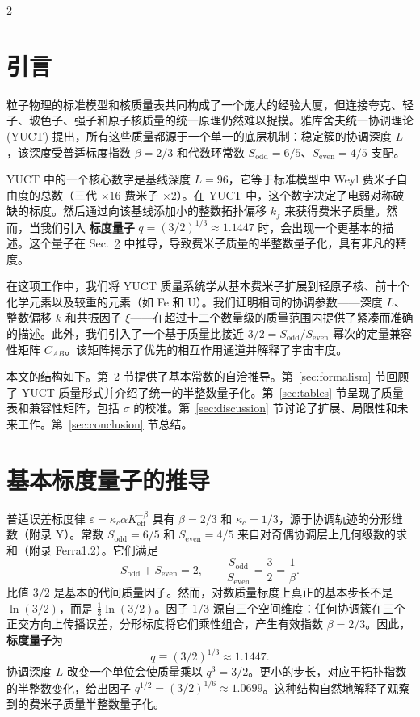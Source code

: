 \documentclass[11pt,a4paper]{article}
\newcommand{\Sodd}{S_{\mathrm{odd}}}
\newcommand{\Seven}{S_{\mathrm{even}}}
\begin{document}
	\begin{multicols}{2}
		
		\section{引言}
		
		粒子物理的标准模型和核质量表共同构成了一个庞大的经验大厦，但连接夸克、轻子、玻色子、强子和原子核质量的统一原理仍然难以捉摸。雅库舍夫统一协调理论 (YUCT) 提出，所有这些质量都源于一个单一的底层机制：稳定簇的协调深度 \(L\)，该深度受普适标度指数 \(\beta = 2/3\) 和代数环常数 \(S_{\mathrm{odd}}=6/5\)、\(S_{\mathrm{even}}=4/5\) 支配。
		
		YUCT 中的一个核心数字是基线深度 \(L = 96\)，它等于标准模型中 Weyl 费米子自由度的总数（三代 $\times 16$ 费米子 $\times 2$）。在 YUCT 中，这个数字决定了电弱对称破缺的标度。然后通过向该基线添加小的整数拓扑偏移 \(k_f\) 来获得费米子质量。然而，当我们引入 \textbf{标度量子} \(q = (3/2)^{1/3} \approx 1.1447\) 时，会出现一个更基本的描述。这个量子在 Sec.~\ref{sec:derivation} 中推导，导致费米子质量的半整数量子化，具有非凡的精度。
		
		在这项工作中，我们将 YUCT 质量系统学从基本费米子扩展到轻原子核、前十个化学元素以及较重的元素（如 Fe 和 U）。我们证明相同的协调参数——深度 \(L\)、整数偏移 \(k\) 和共振因子 \(\xi\)——在超过十二个数量级的质量范围内提供了紧凑而准确的描述。此外，我们引入了一个基于质量比接近 \(3/2 = S_{\mathrm{odd}}/S_{\mathrm{even}}\) 幂次的定量兼容性矩阵 \(C_{AB}\)。该矩阵揭示了优先的相互作用通道并解释了宇宙丰度。
		
		本文的结构如下。第~\ref{sec:derivation} 节提供了基本常数的自洽推导。第~\ref{sec:formalism} 节回顾了 YUCT 质量形式并介绍了统一的半整数量子化。第~\ref{sec:tables} 节呈现了质量表和兼容性矩阵，包括 \(\sigma\) 的校准。第~\ref{sec:discussion} 节讨论了扩展、局限性和未来工作。第~\ref{sec:conclusion} 节总结。
		
		\section{基本标度量子的推导}
		\label{sec:derivation}
		
		普适误差标度律 \(\varepsilon = \kappa_c \alpha K_{\mathrm{eff}}^{-\beta}\) 具有 \(\beta = 2/3\) 和 \(\kappa_c = 1/3\)，源于协调轨迹的分形维数（附录 Y）。常数 \(\Sodd = 6/5\) 和 \(\Seven = 4/5\) 来自对奇偶协调层上几何级数的求和（附录 Ferra1.2）。它们满足
		\[
		\Sodd + \Seven = 2, \qquad \frac{\Sodd}{\Seven} = \frac{3}{2} = \frac{1}{\beta}.
		\]
		比值 \(3/2\) 是基本的代间质量因子。然而，对数质量标度上真正的基本步长不是 \(\ln(3/2)\)，而是 \(\frac{1}{3}\ln(3/2)\)。因子 \(1/3\) 源自三个空间维度：任何协调簇在三个正交方向上传播误差，分形标度将它们乘性组合，产生有效指数 \(\beta = 2/3\)。因此，\textbf{标度量子}为
		\begin{equation}
			q \equiv (3/2)^{1/3} \approx 1.1447.
		\end{equation}
		协调深度 \(L\) 改变一个单位会使质量乘以 \(q^3 = 3/2\)。更小的步长，对应于拓扑指数的半整数变化，给出因子 \(q^{1/2} = (3/2)^{1/6} \approx 1.0699\)。这种结构自然地解释了观察到的费米子质量半整数量子化。
		

\end{multicols}
\end{document}
